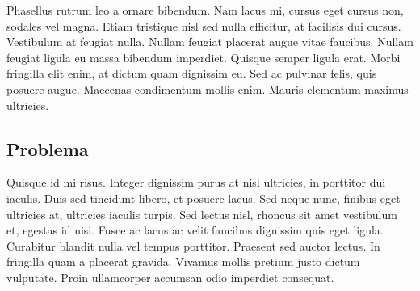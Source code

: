 Phasellus rutrum leo a ornare bibendum. Nam lacus mi, cursus eget cursus non, sodales vel magna. Etiam tristique nisl sed nulla efficitur, at facilisis dui cursus. Vestibulum at feugiat nulla. Nullam feugiat placerat augue vitae faucibus. Nullam feugiat ligula eu massa bibendum imperdiet. Quisque semper ligula erat. Morbi fringilla elit enim, at dictum quam dignissim eu. Sed ac pulvinar felis, quis posuere augue. Maecenas condimentum mollis enim. Mauris elementum maximus ultricies.

\subsection{Problema}
Quisque id mi risus. Integer dignissim purus at nisl ultricies, in porttitor dui iaculis. Duis sed tincidunt libero, et posuere lacus. Sed neque nunc, finibus eget ultricies at, ultricies iaculis turpis. Sed lectus nisl, rhoncus sit amet vestibulum et, egestas id nisi. Fusce ac lacus ac velit faucibus dignissim quis eget ligula. Curabitur blandit nulla vel tempus porttitor. Praesent sed auctor lectus. In fringilla quam a placerat gravida. Vivamus mollis pretium justo dictum vulputate. Proin ullamcorper accumsan odio imperdiet consequat.
